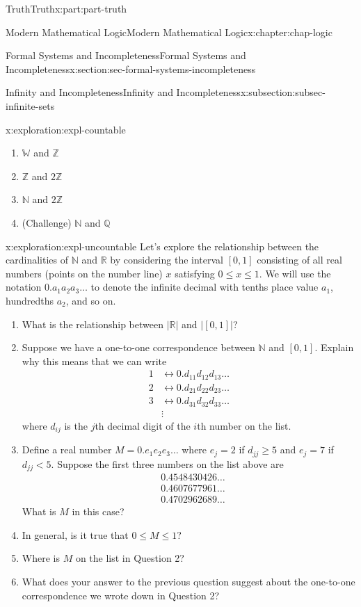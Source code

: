 \documentclass[oneside,10pt,]{book}
\numberwithin{equation}{section}
\renewcommand{\le}{\leqslant}
\renewcommand{\ge}{\geqslant}
\newcommand{\lt}{<}
\newcommand{\amp}{&}
\begin{document}
\begin{partptx}{Truth}{}{Truth}{}{}{x:part:part-truth}
\begin{chapterptx}{Modern Mathematical Logic}{}{Modern Mathematical Logic}{}{}{x:chapter:chap-logic}
\begin{sectionptx}{Formal Systems and Incompleteness}{}{Formal Systems and Incompleteness}{}{}{x:section:sec-formal-systems-incompleteness}
\begin{subsectionptx}{Infinity and Incompleteness}{}{Infinity and Incompleteness}{}{}{x:subsection:subsec-infinite-sets}
\begin{exploration}{}{x:exploration:expl-countable}
\begin{enumerate}
\item{}\(\mathbb{W}\) and \(\mathbb{Z}\)%
\item{}\(\mathbb{Z}\) and \(2\mathbb{Z}\)%
\item{}\(\mathbb{N}\) and \(2\mathbb{Z}\)%
\item{}(Challenge) \(\mathbb{N}\) and \(\mathbb{Q}\)%
\end{enumerate}
\end{exploration}%
\begin{exploration}{}{x:exploration:expl-uncountable}%
Let's explore the relationship between the cardinalities of \(\mathbb{N}\) and \(\mathbb{R}\) by considering the interval \([0,1]\) consisting of all real numbers (points on the number line) \(x\) satisfying \(0 \le x \le 1\). We will use the notation \(0.a_1 a_2 a_3 \ldots\) to denote the infinite decimal with tenths place value \(a_1\), hundredths \(a_2\), and so on.%
%
\begin{enumerate}
\item{}What is the relationship between \(|\mathbb{R}|\) and \(|[0,1]|\)?%
\item{}Suppose we have a one-to-one correspondence between \(\mathbb{N}\) and \([0,1]\). Explain why this means that we can write%
\begin{align*}
1 \amp \leftrightarrow 0.d_{11}d_{12}d_{13}\ldots\\
2 \amp \leftrightarrow 0.d_{21}d_{22}d_{23}\ldots\\
3 \amp \leftrightarrow 0.d_{31}d_{32}d_{33}\ldots\\
\amp \vdots 
\end{align*}
where \(d_{ij}\) is the \(j\)th decimal digit of the \(i\)th number on the list.%
\item{}Define a real number \(M = 0.e_1 e_2 e_3 \ldots\) where \(e_j = 2\) if \(d_{jj} \ge 5\) and \(e_j = 7\) if \(d_{jj} \lt 5\). Suppose the first three numbers on the list above are%
\begin{align*}
\amp 0.4548430426\ldots\\
\amp 0.4607677961\ldots\\
\amp 0.4702962689\ldots
\end{align*}
What is \(M\) in this case?%
\item{}In general, is it true that \(0 \le M \le 1\)?%
\item{}Where is \(M\) on the list in Question 2?%
\item{}What does your answer to the previous question suggest about the one-to-one correspondence we wrote down in Question 2?%

\end{enumerate}
\end{exploration}
\end{subsectionptx}
\end{sectionptx}
\end{chapterptx}
\end{partptx}
\end{document}

